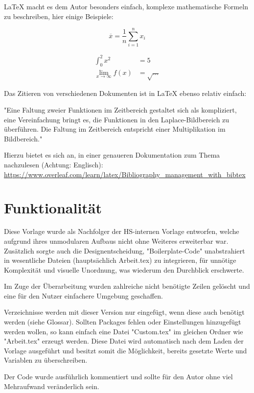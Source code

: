 \LaTeX{} macht es dem Autor besonders einfach, komplexe mathematische Formeln zu beschreiben, hier einige
Beispiele:

\begin{equation}
  \overline{x} = \frac{1}{n} \sum_{i=1}^n x_i
\end{equation}

\begin{align*}
  \int_0^2 x^2 &= 5 \\
  \lim_{x\to\infty} f(x) &= \sqrt{\ldots}
\end{align*}

Das Zitieren von verschiedenen Dokumenten ist in \LaTeX{} ebenso relativ einfach:

"Eine Faltung zweier Funktionen im Zeitbereich gestaltet sich als kompliziert, eine Vereinfachung
bringt es, die Funktionen in den Laplace-Bildbereich zu überführen.
Die Faltung im Zeitbereich entspricht einer Multiplikation im Bildbereich." \cite[S. 339f]{Papula2006}

Hierzu bietet es sich an, in einer genaueren Dokumentation zum Thema nachzulesen (Achtung: Englisch):
\url{https://www.overleaf.com/learn/latex/Bibliography_management_with_bibtex}

\section{Funktionalität}

Diese Vorlage wurde als Nachfolger der HS-internen Vorlage entworfen, welche aufgrund ihres
unmodularen Aufbaus nicht ohne Weiteres erweiterbar war. Zusätzlich sorgte auch die
Designentscheidung, "Boilerplate-Code" unabstrahiert in wesentliche Dateien (hauptsächlich Arbeit.tex)
zu integrieren, für unnötige Komplexität und visuelle Unordnung, was wiederum den Durchblick erschwerte.

Im Zuge der Überarbeitung wurden zahlreiche nicht benötigte Zeilen gelöscht und eine für
den Nutzer einfachere Umgebung geschaffen.

Verzeichnisse werden mit dieser Version nur eingefügt, wenn diese auch benötigt werden (siehe
\Gls{Glossar}). Sollten Packages fehlen oder Einstellungen hinzugefügt werden wollen,
so kann einfach eine Datei "Custom.tex" im gleichen Ordner wie "Arbeit.tex" erzeugt werden.
Diese Datei wird automatisch nach dem Laden der Vorlage ausgeführt und besitzt somit die
Möglichkeit, bereits gesetzte Werte und Variablen zu überschreiben.

Der Code wurde ausführlich kommentiert und sollte für den Autor ohne viel Mehraufwand veränderlich sein.

